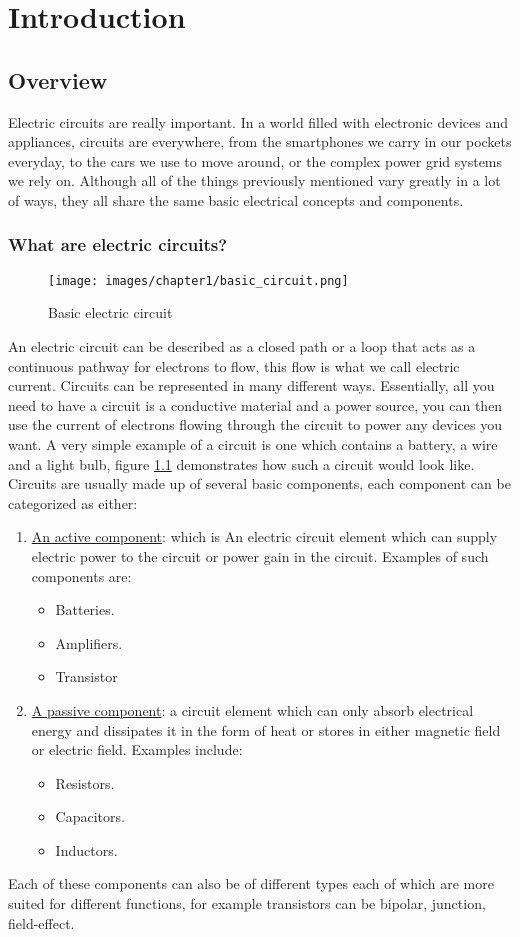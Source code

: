 \documentclass[../main.tex]{subfiles}
\begin{document}
\chapter{Introduction}

\section{Overview}
Electric circuits are really important. In a world filled with electronic devices and appliances, circuits are everywhere, from the smartphones we carry in our pockets everyday, to the cars we use to move around, or the complex power grid systems we rely on. Although all of the things previously mentioned vary greatly in a lot of ways, they all share the same basic electrical concepts and components.

\subsection{What are electric circuits?}
\begin{figure}[ht]
\centering
\texttt{[image: images/chapter1/basic\_circuit.png]}
\caption{Basic electric circuit}
\label{fig:basic circuit}
\end{figure}
An electric circuit can be described as a closed path or a loop that acts as a continuous pathway for electrons to flow, this flow is what we call electric current. Circuits can be represented in many different ways. Essentially, all you need to have a circuit is a conductive material and a power source, you can then use the current of electrons flowing through the circuit to power any devices you want. A very simple example of a circuit is one which contains a battery, a wire and a light bulb, figure \ref{fig:basic circuit} demonstrates how such a circuit would look like.
Circuits are usually made up of several basic components, each component can be categorized as either: 
\begin{enumerate}
\item \underline{An active component}: which is An electric circuit element which can supply electric power to the circuit or power gain in the circuit. Examples of such components are:
\begin{itemize}
\item Batteries.
\item Amplifiers.
\item Transistor
\end{itemize}
\item \underline{A passive component}: a circuit element which can only absorb electrical energy and dissipates it in the form of heat or stores in either magnetic field or electric field. Examples include:
\begin{itemize}
    \item Resistors.
    \item Capacitors.
    \item Inductors.
\end{itemize}
\end{enumerate}
Each of these components can also be of different types each of which are more suited for different functions, for example transistors can be bipolar, junction, field-effect.
\end{document}

